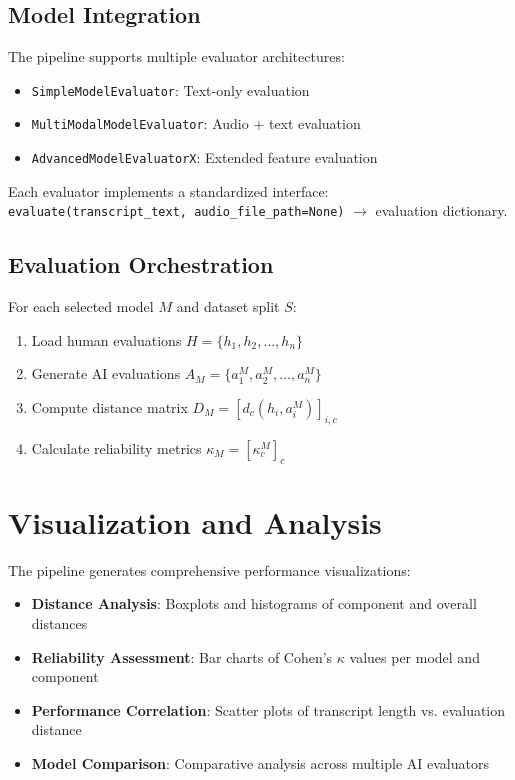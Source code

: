 \documentclass[12pt]{article}
\begin{document}
\subsection{Model Integration}
The pipeline supports multiple evaluator architectures:
\begin{itemize}
    \item \texttt{SimpleModelEvaluator}: Text-only evaluation
    \item \texttt{MultiModalModelEvaluator}: Audio + text evaluation
    \item \texttt{AdvancedModelEvaluatorX}: Extended feature evaluation
\end{itemize}

Each evaluator implements a standardized interface: \texttt{evaluate(transcript\_text, audio\_file\_path=None)} $\rightarrow$ evaluation dictionary.

\subsection{Evaluation Orchestration}
For each selected model $M$ and dataset split $S$:
\begin{enumerate}
    \item Load human evaluations $H = \{h_1, h_2, \ldots, h_n\}$
    \item Generate AI evaluations $A_M = \{a_1^M, a_2^M, \ldots, a_n^M\}$
    \item Compute distance matrix $D_M = [d_c(h_i, a_i^M)]_{i,c}$
    \item Calculate reliability metrics $\kappa_M = [\kappa_c^M]_c$
\end{enumerate}

\section{Visualization and Analysis}

The pipeline generates comprehensive performance visualizations:

\begin{itemize}
    \item \textbf{Distance Analysis}: Boxplots and histograms of component and overall distances
    \item \textbf{Reliability Assessment}: Bar charts of Cohen's $\kappa$ values per model and component
    \item \textbf{Performance Correlation}: Scatter plots of transcript length vs. evaluation distance
    \item \textbf{Model Comparison}: Comparative analysis across multiple AI evaluators
\end{itemize}
\end{document}
